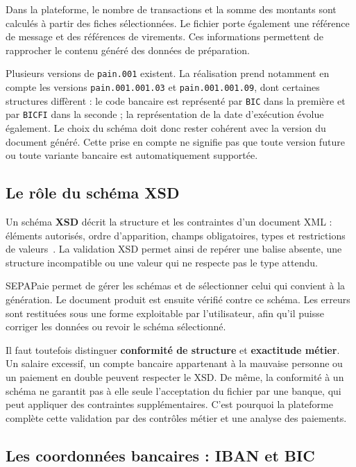 Dans la plateforme, le nombre de transactions et la somme des montants sont calculés à partir des fiches sélectionnées. Le fichier porte également une référence de message et des références de virements. Ces informations permettent de rapprocher le contenu généré des données de préparation.

Plusieurs versions de \texttt{pain.001} existent. La réalisation prend notamment en compte les versions \texttt{pain.001.001.03} et \texttt{pain.001.001.09}, dont certaines structures diffèrent : le code bancaire est représenté par \texttt{BIC} dans la première et par \texttt{BICFI} dans la seconde ; la représentation de la date d'exécution évolue également. Le choix du schéma doit donc rester cohérent avec la version du document généré. Cette prise en compte ne signifie pas que toute version future ou toute variante bancaire est automatiquement supportée.

\subsection{Le rôle du schéma XSD}

Un schéma \textbf{XSD} décrit la structure et les contraintes d'un document XML : éléments autorisés, ordre d'apparition, champs obligatoires, types et restrictions de valeurs~\cite{w3c-xsd}. La validation XSD permet ainsi de repérer une balise absente, une structure incompatible ou une valeur qui ne respecte pas le type attendu.

SEPAPaie permet de gérer les schémas et de sélectionner celui qui convient à la génération. Le document produit est ensuite vérifié contre ce schéma. Les erreurs sont restituées sous une forme exploitable par l'utilisateur, afin qu'il puisse corriger les données ou revoir le schéma sélectionné.

Il faut toutefois distinguer \textbf{conformité de structure} et \textbf{exactitude métier}. Un salaire excessif, un compte bancaire appartenant à la mauvaise personne ou un paiement en double peuvent respecter le XSD. De même, la conformité à un schéma ne garantit pas à elle seule l'acceptation du fichier par une banque, qui peut appliquer des contraintes supplémentaires. C'est pourquoi la plateforme complète cette validation par des contrôles métier et une analyse des paiements.

\subsection{Les coordonnées bancaires : IBAN et BIC}

